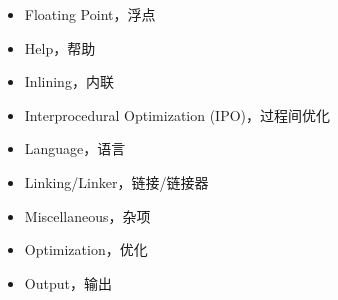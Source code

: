 \documentclass[a4paper,12pt,english]{sphinxmanual}
\begin{document}
\begin{description}
\begin{itemize}
\item {} 
\sphinxAtStartPar
Floating Point，浮点

\end{itemize}

\begin{itemize}
\item {} 
\sphinxAtStartPar
Help，帮助

\end{itemize}

\begin{itemize}
\item {} 
\sphinxAtStartPar
Inlining，内联

\end{itemize}

\begin{itemize}
\item {} 
\sphinxAtStartPar
Interprocedural Optimization (IPO)，过程间优化

\end{itemize}

\begin{itemize}
\item {} 
\sphinxAtStartPar
Language，语言

\end{itemize}

\begin{itemize}
\item {} 
\sphinxAtStartPar
Linking/Linker，链接/链接器

\end{itemize}

\begin{itemize}
\item {} 
\sphinxAtStartPar
Miscellaneous，杂项

\end{itemize}

\begin{itemize}
\item {} 
\sphinxAtStartPar
Optimization，优化

\end{itemize}

\begin{itemize}
\item {} 
\sphinxAtStartPar
Output，输出


\end{itemize}
\end{description}
\end{document}
